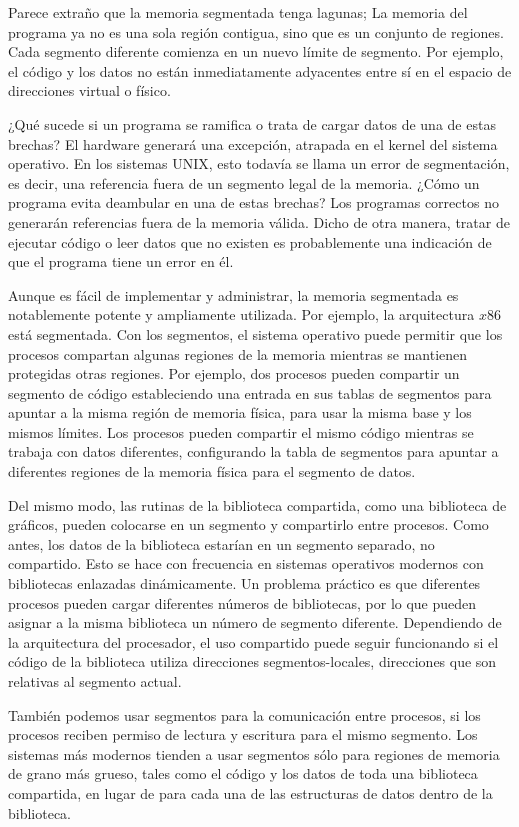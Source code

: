 \documentclass[10pt]{book}
\begin{document}
Parece extraño que la memoria segmentada tenga lagunas; La memoria del programa ya no es una sola región contigua, sino que es un conjunto de regiones. Cada segmento diferente comienza en un nuevo límite de segmento. Por ejemplo, el código y los datos no están inmediatamente adyacentes entre sí en el espacio de direcciones virtual o físico.

¿Qué sucede si un programa se ramifica o trata de cargar datos de una de estas brechas? El hardware generará una excepción, atrapada en el kernel del sistema operativo. En los sistemas UNIX, esto todavía se llama un error de segmentación, es decir, una referencia fuera de un segmento legal de la memoria. ¿Cómo un programa evita deambular en una de estas brechas? Los programas correctos no generarán referencias fuera de la memoria válida. Dicho de otra manera, tratar de ejecutar código o leer datos que no existen es probablemente una indicación de que el programa tiene un error en él.

Aunque es fácil de implementar y administrar, la memoria segmentada es notablemente potente y ampliamente utilizada. Por ejemplo, la arquitectura $x86$ está segmentada. Con los segmentos, el sistema operativo puede permitir que los procesos compartan algunas regiones de la memoria mientras se mantienen protegidas otras regiones. Por ejemplo, dos procesos pueden compartir un segmento de código estableciendo una entrada en sus tablas de segmentos para apuntar a la misma región de memoria física, para usar la misma base y los mismos límites. Los procesos pueden compartir el mismo código mientras se trabaja con datos diferentes, configurando la tabla de segmentos para apuntar a diferentes regiones de la memoria física para el segmento de datos.

Del mismo modo, las rutinas de la biblioteca compartida, como una biblioteca de gráficos, pueden colocarse en un segmento y compartirlo entre procesos. Como antes, los datos de la biblioteca estarían en un segmento separado, no compartido. Esto se hace con frecuencia en sistemas operativos modernos con bibliotecas enlazadas dinámicamente. Un problema práctico es que diferentes procesos pueden cargar diferentes números de bibliotecas, por lo que pueden asignar a la misma biblioteca un número de segmento diferente. Dependiendo de la arquitectura del procesador, el uso compartido puede seguir funcionando si el código de la biblioteca utiliza direcciones segmentos-locales, direcciones que son relativas al segmento actual.

También podemos usar segmentos para la comunicación entre procesos, si los procesos reciben permiso de lectura y escritura para el mismo segmento. Los sistemas más modernos tienden a usar segmentos sólo para regiones de memoria de grano más grueso, tales como el código y los datos de toda una biblioteca compartida, en lugar de para cada una de las estructuras de datos dentro de la biblioteca.
\end{document}

